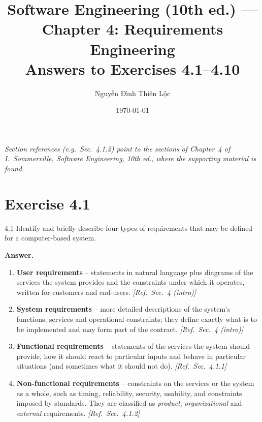 \documentclass[11pt,a4paper]{article}
\title{Software Engineering (10th ed.) --- Chapter 4: Requirements Engineering\\
\large Answers to Exercises 4.1--4.10}
\author{Nguyễn Đình Thiên Lộc}
\date{\today}
\newcommand{\answer}{\par\noindent\textbf{Answer.}\ }
\newcommand{\refsec}[1]{\hfill\textit{\small[Ref.\ Sec.~#1]}}
\begin{document}
\maketitle
\noindent\textit{Section references (e.g.\ Sec.~4.1.2) point to the sections of Chapter~4 of
I.~Sommerville, \emph{Software Engineering}, 10th ed., where the supporting material is found.}

\tableofcontents
\newpage

\section*{Exercise 4.1}
\begin{question}{4.1}
Identify and briefly describe four types of requirements that may be defined for a computer-based system.
\end{question}
\answer
\begin{enumerate}[leftmargin=*]
  \item \textbf{User requirements} -- statements in natural language plus diagrams of the services the
  system provides and the constraints under which it operates, written for customers and end-users.
  \refsec{4 (intro)}
  \item \textbf{System requirements} -- more detailed descriptions of the system's functions, services and
  operational constraints; they define exactly what is to be implemented and may form part of the contract.
  \refsec{4 (intro)}
  \item \textbf{Functional requirements} -- statements of the services the system should provide, how it
  should react to particular inputs and behave in particular situations (and sometimes what it should not do).
  \refsec{4.1.1}
  \item \textbf{Non-functional requirements} -- constraints on the services or the system as a whole, such as
  timing, reliability, security, usability, and constraints imposed by standards. They are classified as
  \emph{product}, \emph{organizational} and \emph{external} requirements. \refsec{4.1.2}
\end{enumerate}

\end{document}
